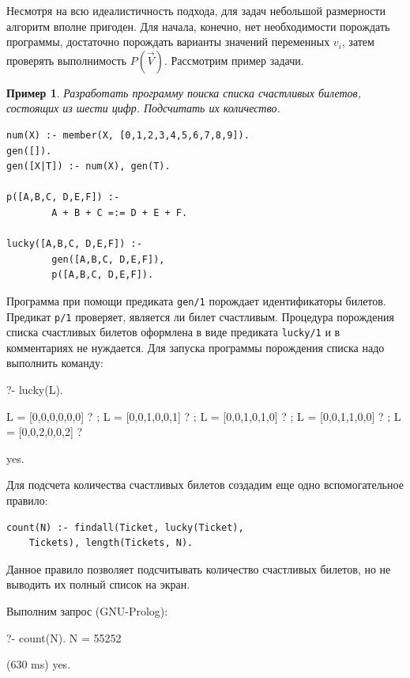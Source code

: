 \documentclass[a4paper,14pt, openany, twoside, draft]{extbook} %
\newtheorem{example}{Пример}[chapter]
\begin{document}
Несмотря на всю идеалистичность подхода, для задач небольшой размерности алгоритм вполне пригоден. Для начала, конечно, нет необходимости порождать программы, достаточно порождать варианты значений переменных $v_i$, затем проверять выполнимость $P(\vec{V})$. Рассмотрим пример задачи.

\begin{example}
Разработать программу поиска списка счастливых билетов, состоящих из шести цифр. Подсчитать их количество.
\end{example}

\begin{verbatim}
num(X) :- member(X, [0,1,2,3,4,5,6,7,8,9]).
gen([]).
gen([X|T]) :- num(X), gen(T).

p([A,B,C, D,E,F]) :-
        A + B + C =:= D + E + F.

lucky([A,B,C, D,E,F]) :-
        gen([A,B,C, D,E,F]),
        p([A,B,C, D,E,F]).
\end{verbatim}

Программа при помощи предиката \texttt{gen/1} порождает идентификаторы билетов. Предикат \texttt{p/1} проверяет, является ли билет счастливым. Процедура порождения списка счастливых билетов оформлена в виде предиката \texttt{lucky/1} и в комментариях не нуждается. Для запуска программы порождения списка надо выполнить команду:

\begin{proexp}
?- lucky(L).

L = [0,0,0,0,0,0] ? ;
L = [0,0,1,0,0,1] ? ;
L = [0,0,1,0,1,0] ? ;
L = [0,0,1,1,0,0] ? ;
L = [0,0,2,0,0,2] ?

yes.
\end{proexp}

\noindent{}Для подсчета количества счастливых билетов создадим еще одно вспомогательное правило:

\begin{verbatim}
count(N) :- findall(Ticket, lucky(Ticket),
    Tickets), length(Tickets, N).
\end{verbatim}

\noindent{}Данное правило позволяет подсчитывать количество счастливых билетов, но не выводить их полный список на экран.

Выполним запрос (GNU-Prolog):

\begin{proexp}
?- count(N).
N = 55252

(630 ms) yes.
\end{proexp}
\end{document}
